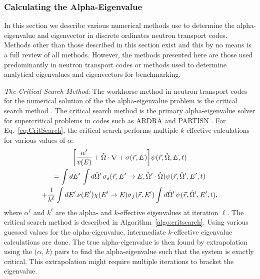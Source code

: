 \subsubsection{Calculating the Alpha-Eigenvalue}
\label{sec:CalcAlpha}

In this section we describe various numerical methods use to determine the alpha-eigenvalue and eigenvector in discrete ordinates neutron transport codes. 
Methods other than those described in this section exist and this by no means is a full review of all methods. However, the methods presented here are those used predominantly in neutron transport codes or methods used to determine analytical eigenvalues and eigenvectors for benchmarking.

\textit{The Critical Search Method}: The workhorse method in neutron transport codes for the numerical solution of the the alpha-eigenvalue problem is the critical search method \cite{hill_efficient_1983}. The critical search method is the primary alpha-eigenvalue solver for supercritical problems in codes such as ARDRA \cite{hanebutte_ardra_1999} and PARTISN \cite{alcouffe2005partisn}. For Eq.~\ref{eq:CritSearch}, the critical search performs multiple $k$-effective calculations for various values of $\alpha$:
\begin{multline}
	\bigg [ \frac{\alpha^{\ell}}{v(E)}  + \hat{\Omega} \cdot \nabla + \sigma(\vec{r},E) \bigg ] \psi(\vec{r},\hat{\Omega},E,t) \\ = \int \mathop{}\!d E' \, \int \mathop{}\!d \hat{\Omega}' \, \sigma_{s}(\vec{r},E'\rightarrow E,\hat{\Omega}' \cdot \hat{\Omega}) \psi(\vec{r},\hat{\Omega}',E',t) \\ + \frac{1}{k^{\ell}}\int \mathop{}\!d E' \, \nu(E') \chi(E'\rightarrow E) \sigma_{f}(\vec{r},E') \int \mathop{}\!d \hat{\Omega}' \, \psi(\vec{r},\hat{\Omega}',E',t), 
	\label{eq:CritSearch}
\end{multline}
where $\alpha^{\ell}$ and $k^{\ell}$ are the alpha- and $k$-effective eigenvalues at iteration $\ell$.
The critical search method is described in Algorithm~\ref{algo:critsearch}. Using various guessed values for the alpha-eigenvalue, intermediate $k$-effective eigenvalue calculations are done. The true alpha-eigenvalue is then found by extrapolation using the ($\alpha$, $k$) pairs to find the alpha-eigenvalue such that the system is exactly critical. This extrapolation might require multiple iterations to bracket the eigenvalue. 

